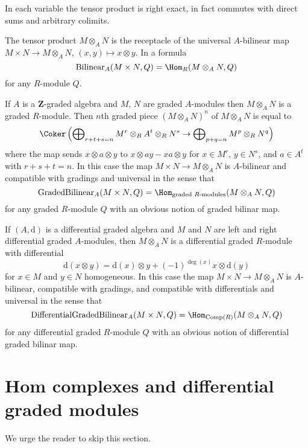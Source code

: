 \medskip\noindent
In each variable the tensor product is right exact, in fact commutes
with direct sums and arbitrary colimits.

\medskip\noindent
The tensor product $M \otimes_A N$ is the receptacle of the universal
$A$-bilinear map $M \times N \to M \otimes_A N$, $(x, y) \mapsto x \otimes y$.
In a formula
$$
\text{Bilinear}_A(M \times N, Q) = \Hom_R(M \otimes_A N, Q)
$$
for any $R$-module $Q$.

\medskip\noindent
If $A$ is a $\mathbf{Z}$-graded algebra and $M$, $N$ are graded
$A$-modules then $M \otimes_A N$ is a graded $R$-module.
Then $n$th graded piece $(M \otimes_A N)^n$ of $M \otimes_A N$
is equal to
$$
\Coker\left(
\bigoplus\nolimits_{r + t + s = n}
M^r \otimes_R A^t \otimes_R N^s \to
\bigoplus\nolimits_{p + q = n} M^p \otimes_R N^q
\right)
$$
where the map sends $x \otimes a \otimes y$ to
$x \otimes ay - xa \otimes y$ for
$x \in M^r$, $y \in N^s$, and $a \in A^t$ with $r + s + t = n$.
In this case the map $M \times N \to M \otimes_A N$ is $A$-bilinear
and compatible with gradings and universal in the sense that
$$
\text{GradedBilinear}_A(M \times N, Q) =
\Hom_{\text{graded }R\text{-modules}}(M \otimes_A N, Q)
$$
for any graded $R$-module $Q$ with an obvious notion of graded
bilinar map.

\medskip\noindent
If $(A, \text{d})$ is a differential graded algebra and
$M$ and $N$ are left and right differential graded $A$-modules, then
$M \otimes_A N$ is a differential graded $R$-module with differential
$$
\text{d}(x \otimes y) =
\text{d}(x) \otimes y + (-1)^{\deg(x)}x \otimes \text{d}(y)
$$
for $x \in M$ and $y \in N$ homogeneous. In this case the map
$M \times N \to M \otimes_A N$ is $A$-bilinear, compatible with gradings,
and compatible with differentials and universal in the sense that
$$
\text{DifferentialGradedBilinear}_A(M \times N, Q) =
\Hom_{\text{Comp}(R)}(M \otimes_A N, Q)
$$
for any differential graded $R$-module $Q$ with an obvious notion of
differential graded bilinar map.






\section{Hom complexes and differential graded modules}
\label{section-hom-complexes}

\noindent
We urge the reader to skip this section.

